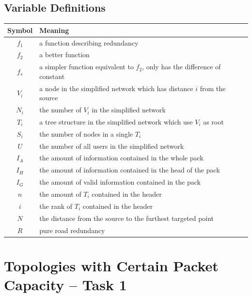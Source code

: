 \documentclass{mcmthesis}
\begin{document}
\subsection{Variable Definitions}
\begin{center}
	\begin{tabular}{cl}
		\hline
		Symbol  & Meaning                      \\
		\hline
		$f_{1}$ & a function describing redundancy \\
		$f_{2}$ & a better function                \\
		$f_{s}$ & a simpler function equivalent to $f_{2}$, only has the difference of constant                                \\
		$V_{i}$ & a node in the simplified network which has distance $i$ from the source                                 \\
		$N_{i}$ & the number of $V_{i}$ in the simplified network                                 \\
		$T_{i}$ & a tree structure in the simplified network which use $V_{i}$ as root                                  \\
		$S_{i}$ & the number of nodes in a single $T_{i}$                                 \\
		$U$     & the number of all users in the simplified network                                \\
		$I_{A}$ & the amount of information contained in the whole pack                                 \\
		$I_{H}$ & the amount of information contained in the head of the pack                                   \\
		$I_{G}$ & the amount of valid information contained in the pack                                  \\
		$n$     & the amount of $T_{i}$ contained in the header                                 \\
		$i$     & the rank of $T_{i}$ contained in the header                                 \\
		$N$     & the distance from the source to the furthest targeted point                                 \\
		$R$     & pure road redundancy                                 \\
		\hline
	\end{tabular}
\end{center}

\section{Topologies with Certain Packet Capacity -- Task 1}
\end{document}
